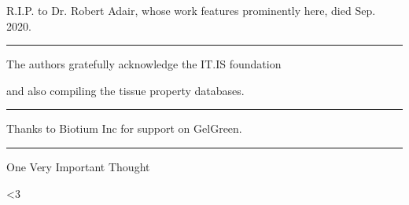 \documentclass[paper.tex]{subfiles}
\begin{document}
R.I.P. to Dr. Robert Adair, whose work features prominently here, died Sep. 2020. 


\rule{\linewidth}{0.2pt}

The authors gratefully acknowledge the IT.IS foundation 

and also compiling the tissue property databases.

\rule{\linewidth}{0.2pt}

Thanks to Biotium Inc for support on GelGreen.

\rule{\linewidth}{0.2pt}

One Very Important Thought


{\Large {\verbatim <3}}
\end{document}
